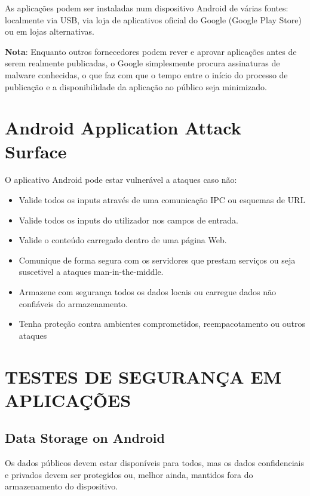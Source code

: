 \documentclass{article}
\begin{document}
As aplicações podem ser instaladas num dispositivo Android de várias fontes: localmente via USB, via loja de aplicativos oficial do Google (Google Play Store) ou em lojas alternativas.
\\
\begin{shaded}
\par \textbf{Nota}: Enquanto outros fornecedores podem rever e aprovar aplicações antes de serem realmente publicadas, o Google simplesmente procura assinaturas de malware conhecidas, o que faz com que o tempo entre o início do processo de publicação e a disponibilidade da aplicação ao público seja minimizado.
\end{shaded}

\newpage
\section{Android Application Attack Surface}
O aplicativo Android pode estar vulnerável a ataques caso não:
\begin{itemize}
    \item Valide todos os inputs através de uma comunicação IPC ou esquemas de URL
    \item Valide todos os inputs do utilizador nos campos de entrada.
    \item Valide o conteúdo carregado dentro de uma página Web.
    \item Comunique de forma segura com os servidores que prestam serviços ou seja suscetivel a ataques man-in-the-middle.
    \item Armazene com segurança todos os dados locais ou carregue dados não confiáveis do armazenamento.
    \item Tenha proteção contra ambientes comprometidos, reempacotamento ou outros ataques
\end{itemize}



\section{TESTES DE SEGURANÇA EM APLICAÇÕES}

\subsection{Data Storage on Android}
Os dados públicos devem estar disponíveis para todos, mas os dados confidenciais e privados devem ser protegidos ou, melhor ainda, mantidos fora do armazenamento do dispositivo.
\end{document}
